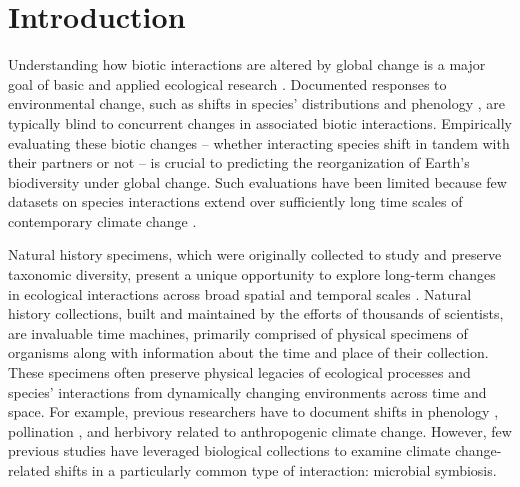 \documentclass[11pt]{article}
\let\cite\citep
\newcommand{\revise}[1]{{\color{black}{#1}}}
\begin{document}
	
	\newpage{}
	
	\section*{Introduction}
	
	
Understanding how biotic interactions are altered by global change is a major goal of basic and applied ecological research \cite{gilman2010framework,blois2013climate}.
Documented responses to environmental change, such as shifts in species' distributions \cite{aitken2008adaptation} and phenology \cite{piao2019plant}, are typically blind to concurrent changes in associated biotic interactions.
Empirically evaluating these biotic changes -- whether interacting species shift in tandem with their partners or not \cite{hillerislambers2013will} -- is crucial to predicting the reorganization of Earth's biodiversity under global change. 
Such evaluations have been limited because few datasets on species interactions extend over sufficiently long time scales of contemporary climate change \cite{poisot2021global}.

Natural history specimens, which were originally collected to study and preserve taxonomic diversity, present a unique opportunity to explore long-term changes in ecological interactions across broad spatial and temporal scales \citep{meineke2018unrealized}. 
Natural history collections, built and maintained by the efforts of thousands of scientists, are invaluable time machines, primarily comprised of physical specimens of organisms along with information about the time and place of their collection. 
These specimens often preserve physical legacies of ecological processes and species' interactions from dynamically changing environments across time and space.
For example, previous researchers have \revise{examined the flowers, pollen grains, and leaves of specimens within plant collections (herbaria) collected across time} to document shifts in \revise{reproductive} phenology \citep{willis2017old, park2019herbarium,  berg2019examination}, pollination \citep{pauw2011reconstruction, duan2019century}, and herbivory \citep{meineke2019herbarium} related to anthropogenic climate change. 
However, few previous studies have leveraged biological collections to examine climate change-related shifts in a particularly common type of interaction: microbial symbiosis.
\end{document}
